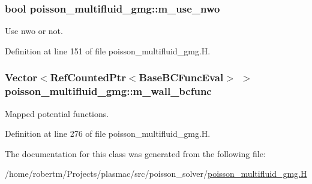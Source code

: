 \subsubsection[{\texorpdfstring{m\+\_\+use\+\_\+nwo}{m_use_nwo}}]{\setlength{\rightskip}{0pt plus 5cm}bool poisson\+\_\+multifluid\+\_\+gmg\+::m\+\_\+use\+\_\+nwo\hspace{0.3cm}{\ttfamily [protected]}}\hypertarget{classpoisson__multifluid__gmg_aa3438296d40eb763590cdfc9f5044b4f}{}\label{classpoisson__multifluid__gmg_aa3438296d40eb763590cdfc9f5044b4f}


Use nwo or not. 



Definition at line 151 of file poisson\+\_\+multifluid\+\_\+gmg.\+H.

\subsubsection[{\texorpdfstring{m\+\_\+wall\+\_\+bcfunc}{m_wall_bcfunc}}]{\setlength{\rightskip}{0pt plus 5cm}Vector$<$Ref\+Counted\+Ptr$<$Base\+B\+C\+Func\+Eval$>$ $>$ poisson\+\_\+multifluid\+\_\+gmg\+::m\+\_\+wall\+\_\+bcfunc\hspace{0.3cm}{\ttfamily [protected]}}\hypertarget{classpoisson__multifluid__gmg_a757da03ff336cf79b78b00aabe2205b5}{}\label{classpoisson__multifluid__gmg_a757da03ff336cf79b78b00aabe2205b5}


Mapped potential functions. 



Definition at line 276 of file poisson\+\_\+multifluid\+\_\+gmg.\+H.



The documentation for this class was generated from the following file\+:\begin{DoxyCompactItemize}
\item 
/home/robertm/\+Projects/plasmac/src/poisson\+\_\+solver/\hyperlink{poisson__multifluid__gmg_8H}{poisson\+\_\+multifluid\+\_\+gmg.\+H}\end{DoxyCompactItemize}
